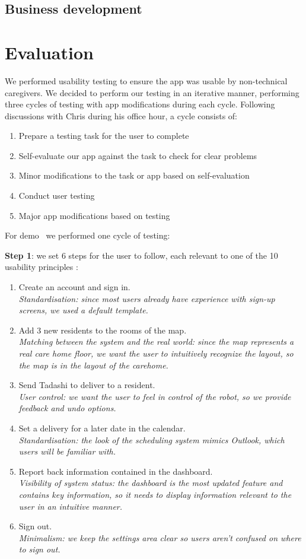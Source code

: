 \documentclass{article}
\begin{document}
\subsection{Business development}

\section{Evaluation}
We performed usability testing to ensure the app was usable by non-technical caregivers. We decided to perform our testing in an iterative manner, performing three cycles of testing with app modifications during each cycle. Following discussions with Chris during his office hour, a cycle consists of:
\begin{enumerate}
  \item Prepare a testing task for the user to complete
  \item Self-evaluate our app against the task to check for clear problems
  \item Minor modifications to the task or app based on self-evaluation
  \item Conduct user testing
  \item Major app modifications based on testing
\end{enumerate}

For demo \demoNumber\ we performed one cycle of testing:

{\bf Step 1}: we set 6 steps for the user to follow, each relevant to one of the 10 usability principles \cite{heuristics}:
\begin{enumerate}
  \item Create an account and sign in. \\{\it Standardisation: since most users already have experience with sign-up screens, we used a default template.}
  \item Add 3 new residents to the rooms of the map. \\{\it Matching between the system and the real world: since the map represents a real care home floor, we want the user to intuitively recognize the layout, so the map is in the layout of the carehome.}
  \item Send Tadashi to deliver to a resident. \\{\it User control: we want the user to feel in control of the robot, so we provide feedback and undo options.}
  \item Set a delivery for a later date in the calendar. \\{\it Standardisation: the look of the scheduling system mimics Outlook, which users will be familiar with.}
  \item Report back information contained in the dashboard. \\{\it Visibility of system status: the dashboard is the most updated feature and contains key information, so it needs to display information relevant to the user in an intuitive manner.}
  \item Sign out. \\{\it Minimalism: we keep the settings area clear so users aren't confused on where to sign out.}
\end{enumerate}
\end{document}
